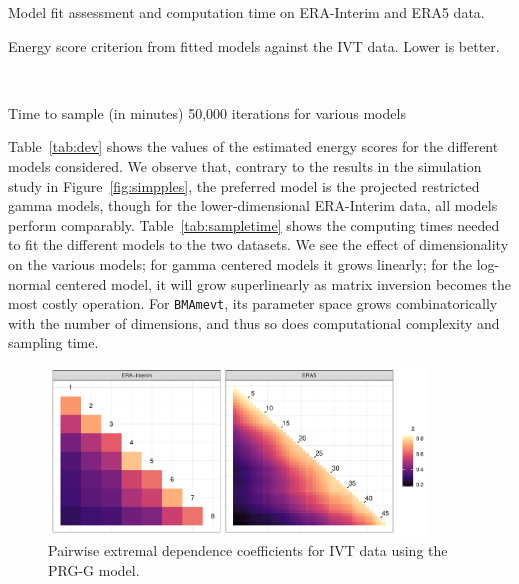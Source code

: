 %   

\begin{table}[t]
    \centering
    \caption{Model fit assessment and computation time on ERA-Interim and ERA5 data.}
    \begin{subtable}{0.7\textwidth}
    \centering
    
    \caption{Energy score criterion from fitted models against the IVT data. Lower is better.\label{tab:dev}}
    \end{subtable}
    \\
    \bigskip
    \begin{subtable}{0.7\textwidth}
    \centering
    
    \caption{Time to sample (in minutes) 50,000 iterations for various models\label{tab:sampletime}}
    \end{subtable}%
\end{table}



Table~\ref{tab:dev} shows the values of the estimated energy 
    scores for the different models considered. We observe that, contrary to the results in the
    simulation study in Figure~\ref{fig:simpples}, the preferred model is the projected restricted 
    gamma models, though for the lower-dimensional ERA-Interim data, all models perform comparably.
    Table~\ref{tab:sampletime} shows the computing times needed to fit the different models to the
    two datasets.  We see the effect of dimensionality on the various models; for gamma centered
    models it grows linearly; for the log-normal centered model, it will grow superlinearly as matrix
    inversion becomes the most costly operation.  For \verb|BMAmevt|, its parameter space grows
    combinatorically with the number of dimensions, and thus so does computational complexity and
    sampling time.

\begin{figure}[b]
    \centering
    \includegraphics[width=0.9\textwidth]{./images/chi_ij_c}
    \caption{Pairwise extremal dependence coefficients for IVT data using the PRG-G model.\label{fig:chi_ij}}
\end{figure}

